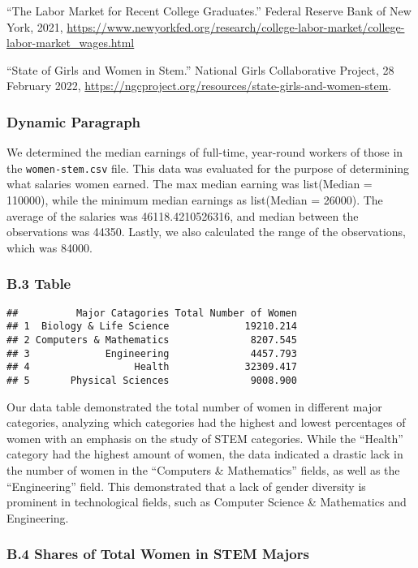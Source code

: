 \documentclass[
]{article}
\begin{document}
``The Labor Market for Recent College Graduates.'' Federal Reserve Bank
of New York, 2021,
\url{https://www.newyorkfed.org/research/college-labor-market/college-labor-market_wages.html}

``State of Girls and Women in Stem.'' National Girls Collaborative
Project, 28 February 2022,
\url{https://ngcproject.org/resources/state-girls-and-women-stem}.

\hypertarget{dynamic-paragraph}{%
\subsubsection{Dynamic Paragraph}\label{dynamic-paragraph}}

We determined the median earnings of full-time, year-round workers of
those in the \texttt{women-stem.csv} file. This data was evaluated for
the purpose of determining what salaries women earned. The max median
earning was list(Median = 110000), while the minimum median earnings as
list(Median = 26000). The average of the salaries was 46118.4210526316,
and median between the observations was 44350. Lastly, we also
calculated the range of the observations, which was 84000.

\hypertarget{b.3-table}{%
\subsubsection{B.3 \textbar{} Table}\label{b.3-table}}

\begin{verbatim}
##          Major Catagories Total Number of Women
## 1  Biology & Life Science             19210.214
## 2 Computers & Mathematics              8207.545
## 3             Engineering              4457.793
## 4                  Health             32309.417
## 5       Physical Sciences              9008.900
\end{verbatim}

Our data table demonstrated the total number of women in different major
categories, analyzing which categories had the highest and lowest
percentages of women with an emphasis on the study of STEM categories.
While the ``Health'' category had the highest amount of women, the data
indicated a drastic lack in the number of women in the ``Computers \&
Mathematics'' fields, as well as the ``Engineering'' field. This
demonstrated that a lack of gender diversity is prominent in
technological fields, such as Computer Science \& Mathematics and
Engineering.

\hypertarget{b.4-shares-of-total-women-in-stem-majors}{%
\subsubsection{B.4 \textbar{} Shares of Total Women in STEM
Majors}\label{b.4-shares-of-total-women-in-stem-majors}}
\end{document}
